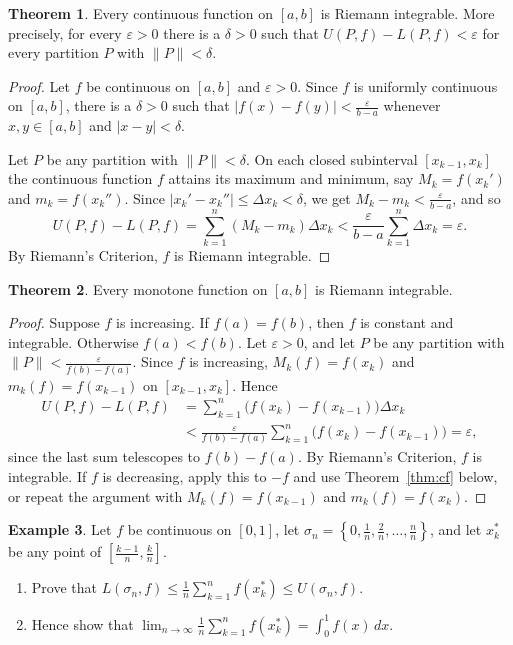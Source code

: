 \documentclass[11pt,a4paper]{article}
\numberwithin{equation}{section}
\theoremstyle{definition}
\newtheorem{thm}{Theorem}[subsection]
\newtheorem{exa}[thm]{Example}
\begin{document}
\begin{thm}\label{thm:contint}
Every continuous function on $[a,b]$ is Riemann integrable. More precisely, for every $\varepsilon>0$ there is a $\delta>0$ such that $U(P,f) - L(P,f)<\varepsilon$ for every partition $P$ with $\|P\|<\delta$.
\end{thm}

\begin{proof}
Let $f$ be continuous on $[a,b]$ and $\varepsilon > 0$. Since $f$ is uniformly continuous on $[a,b]$, there is a $\delta > 0$ such that $|f(x) - f(y)| < \frac{\varepsilon}{b - a}$ whenever $x, y\in [a,b]$ and $|x - y| < \delta$.

Let $P$ be any partition with $\|P\| < \delta$. On each closed subinterval $[x_{k-1},x_k]$ the continuous function $f$ attains its maximum and minimum, say $M_k = f(x_k')$ and $m_k = f(x_k'')$. Since $|x_k' - x_k''|\leq\Delta x_k < \delta$, we get $M_k - m_k < \frac{\varepsilon}{b - a}$, and so
$$U(P,f) - L(P,f) = \sum^n_{k = 1}(M_k - m_k)\Delta x_k < \frac{\varepsilon}{b - a}\sum^n_{k = 1}\Delta x_k = \varepsilon .$$
By Riemann's Criterion, $f$ is Riemann integrable.
\end{proof}


\begin{thm}
Every monotone function on $[a,b]$ is Riemann integrable.
\end{thm}

\begin{proof}
Suppose $f$ is increasing. If $f(a) = f(b)$, then $f$ is constant and integrable. Otherwise $f(a)<f(b)$. Let $\varepsilon > 0$, and let $P$ be any partition with $\|P\| < \frac{\varepsilon}{f(b) - f(a)}$. Since $f$ is increasing, $M_k(f) =f(x_k)$ and $m_k(f) = f(x_{k-1})$ on $[x_{k - 1}, x_k]$. Hence
\begin{align*}
U(P,f) - L(P,f) &= \sum^n_{k  = 1} \bigl(f(x_k) - f(x_{k - 1})\bigr) \Delta x_k\\
&< \frac{\varepsilon}{f(b) - f(a)} \sum^n_{k  = 1} \bigl(f(x_k) - f(x_{k - 1})\bigr) = \varepsilon ,
\end{align*}
since the last sum telescopes to $f(b)-f(a)$. By Riemann's Criterion, $f$ is integrable. If $f$ is decreasing, apply this to $-f$ and use Theorem~\ref{thm:cf} below, or repeat the argument with $M_k(f) = f(x_{k-1})$ and $m_k(f) = f(x_k)$.
\end{proof}


\begin{exa}
Let $f$ be continuous on $[0,1]$, let $\sigma_n = \left\{0, \frac{1}{n}, \frac{2}{n}, \dots, \frac{n}{n}\right\}$, and let $x^*_k$ be any point of $\left[\frac{k - 1}{n}, \frac{k}{n}\right]$.
\begin{enumerate}
\item[(i)] Prove that $L(\sigma_n, f) \leq \frac{1}{n} \sum_{k =1}^n f(x^*_k) \leq U(\sigma_n,f)$.
\item[(ii)] Hence show that $\lim_{n\rightarrow\infty}\frac{1}{n} \sum^n_{k  = 1} f(x^*_k) = \int^1_0f(x)\, dx$.
\end{enumerate}
\end{exa}
\end{document}
